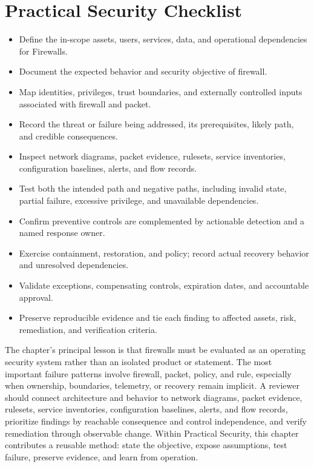 \documentclass[11pt]{article}
\begin{document}
\section*{Practical Security Checklist}
\begin{itemize}[label=$\square$]
\item Define the in-scope assets, users, services, data, and operational dependencies for Firewalls.
\item Document the expected behavior and security objective of firewall.
\item Map identities, privileges, trust boundaries, and externally controlled inputs associated with firewall and packet.
\item Record the threat or failure being addressed, its prerequisites, likely path, and credible consequences.
\item Inspect network diagrams, packet evidence, rulesets, service inventories, configuration baselines, alerts, and flow records.
\item Test both the intended path and negative paths, including invalid state, partial failure, excessive privilege, and unavailable dependencies.
\item Confirm preventive controls are complemented by actionable detection and a named response owner.
\item Exercise containment, restoration, and policy; record actual recovery behavior and unresolved dependencies.
\item Validate exceptions, compensating controls, expiration dates, and accountable approval.
\item Preserve reproducible evidence and tie each finding to affected assets, risk, remediation, and verification criteria.
\end{itemize}
\begin{synthesisbox}
The chapter's principal lesson is that firewalls must be evaluated as an operating security system rather than an isolated product or statement. The most important failure patterns involve firewall, packet, policy, and rule, especially when ownership, boundaries, telemetry, or recovery remain implicit. A reviewer should connect architecture and behavior to network diagrams, packet evidence, rulesets, service inventories, configuration baselines, alerts, and flow records, prioritize findings by reachable consequence and control independence, and verify remediation through observable change. Within Practical Security, this chapter contributes a reusable method: state the objective, expose assumptions, test failure, preserve evidence, and learn from operation.
\end{synthesisbox}
\end{document}
